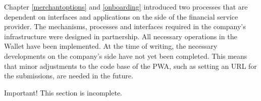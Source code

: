 Chapter \ref{merchantoptions} and \ref{onboarding} introduced two processes that are dependent on interfaces and applications on the side of the financial service provider. The mechanisms, processes and interfaces required in the company's infrastructure were designed in partnership. All necessary operations in the Wallet have been implemented. At the time of writing, the necessary developments on the company's side have not yet been completed. This means that minor adjustments to the code base of the PWA, such as setting an URL for the submissions, are needed in the future.


\begin{bclogo}[logo=\bcattention, couleurBarre=red, noborder=true, 
               couleur=LightSalmon]{Important!}
This section is incomplete.
\end{bclogo}